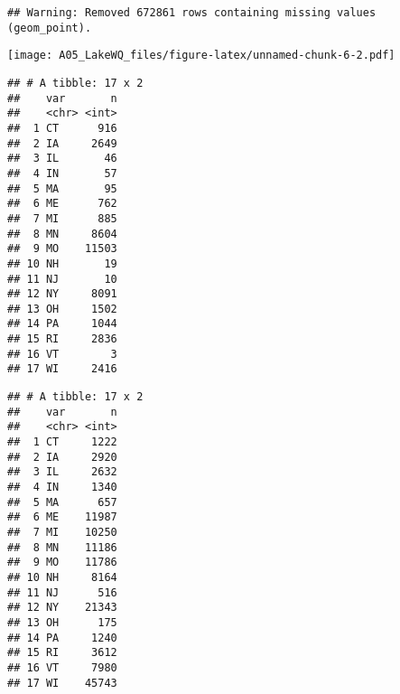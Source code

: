 \documentclass[]{article}
\newenvironment{Shaded}{\begin{snugshade}}{\end{snugshade}}
\newcommand{\CommentTok}[1]{\textcolor[rgb]{0.56,0.35,0.01}{\textit{#1}}}
\newcommand{\DataTypeTok}[1]{\textcolor[rgb]{0.13,0.29,0.53}{#1}}
\newcommand{\KeywordTok}[1]{\textcolor[rgb]{0.13,0.29,0.53}{\textbf{#1}}}
\newcommand{\NormalTok}[1]{#1}
\newcommand{\OperatorTok}[1]{\textcolor[rgb]{0.81,0.36,0.00}{\textbf{#1}}}
\newcommand{\StringTok}[1]{\textcolor[rgb]{0.31,0.60,0.02}{#1}}
\begin{document}
\begin{verbatim}
## Warning: Removed 672861 rows containing missing values (geom_point).
\end{verbatim}

\texttt{[image: A05\_LakeWQ\_files/figure-latex/unnamed-chunk-6-2.pdf]}

\begin{Shaded}
\end{Shaded}

\begin{verbatim}
## # A tibble: 17 x 2
##    var       n
##    <chr> <int>
##  1 CT      916
##  2 IA     2649
##  3 IL       46
##  4 IN       57
##  5 MA       95
##  6 ME      762
##  7 MI      885
##  8 MN     8604
##  9 MO    11503
## 10 NH       19
## 11 NJ       10
## 12 NY     8091
## 13 OH     1502
## 14 PA     1044
## 15 RI     2836
## 16 VT        3
## 17 WI     2416
\end{verbatim}

\begin{Shaded}
\end{Shaded}

\begin{verbatim}
## # A tibble: 17 x 2
##    var       n
##    <chr> <int>
##  1 CT     1222
##  2 IA     2920
##  3 IL     2632
##  4 IN     1340
##  5 MA      657
##  6 ME    11987
##  7 MI    10250
##  8 MN    11186
##  9 MO    11786
## 10 NH     8164
## 11 NJ      516
## 12 NY    21343
## 13 OH      175
## 14 PA     1240
## 15 RI     3612
## 16 VT     7980
## 17 WI    45743
\end{verbatim}
\end{document}

